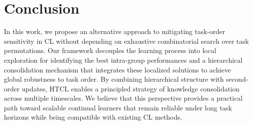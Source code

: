 \section{Conclusion}\label{sec:conclusion}

In this work, we propose an alternative approach to mitigating task-order sensitivity in CL without depending on exhaustive combinatorial search over task permutations. Our framework decouples the learning process into local exploration for identifying the best intra-group performances and a hierarchical consolidation mechanism that integrates these localized solutions to achieve global robustness to task order. By combining hierarchical structure with second-order updates, HTCL enables a principled strategy of knowledge consolidation across multiple timescales. We believe that this perspective provides a practical path toward scalable continual learners that remain reliable under long task horizons while being compatible with existing CL methods. 
